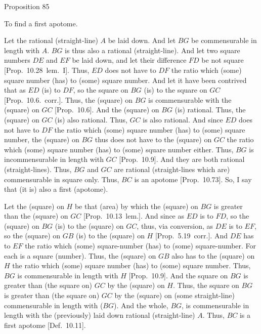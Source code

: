 
\begin{center}
{\large Proposition 85}
\end{center}

To find a first apotome.

\epsfysize=0.65in
\centerline{}

Let the rational (straight-line) $A$ be laid down. And let $BG$
be commensurable in length with $A$. $BG$ is thus also a rational (straight-line).
And let two square numbers
$DE$ and $EF$ be laid down, and let their difference $FD$ be  not 
square [Prop.~10.28~lem.~I]. Thus,
$ED$ does not have to $DF$ the ratio which (some) square number
(has) to (some) square number. And let it have been contrived that
as $ED$ (is) to $DF$, so the square on $BG$ (is) to the square on $GC$
[Prop.~10.6.~corr.]. Thus, the (square) on $BG$
is commensurable with the (square) on $GC$ [Prop.~10.6]. And the (square) on $BG$ (is)
rational. Thus, the (square) on $GC$ (is) also rational. Thus, $GC$ is also
rational. And since $ED$ does not have to $DF$ the ratio which
(some) square number (has) to (some) square number, 
the (square) on $BG$ thus does not have to the (square) on $GC$ the ratio
which (some) square number (has) to (some) square number either. Thus,
$BG$ is incommensurable in length with $GC$ [Prop.~10.9]. And they are both
rational (straight-lines). Thus, $BG$ and $GC$ are rational (straight-lines
which are) commensurable in square only. Thus, $BC$ is an apotome
[Prop.~10.73]. So, I say that (it is)
also a first (apotome).

Let the (square) on $H$ be that (area) by which the (square) on $BG$
is greater than the (square) on $GC$ [Prop.~10.13~lem.]. And since as $ED$ is to
$FD$, so the (square) on $BG$ (is) to the (square) on $GC$, thus, via
conversion, as $DE$ is to $EF$, so the (square) on $GB$ (is) to the
(square) on $H$ [Prop.~5.19~corr.]. 
And $DE$ has to $EF$ the ratio which (some) square-number
(has) to (some) square-number. For each is a square (number). 
Thus, the (square) on $GB$ also has to the (square) on $H$ the ratio which
(some) square number (has) to (some) square number. Thus, $BG$
is commensurable in length with $H$ [Prop.~10.9].
And the square on $BG$ is greater than (the square on) $GC$ by the
(square) on $H$. Thus, the square on $BG$ is greater than (the square on) $GC$ by the
(square) on (some straight-line) commensurable in length with ($BG$).
And the whole, $BG$, is commensurable in length with the (previously)
laid down rational (straight-line) $A$. Thus, $BC$ is a first
apotome [Def.~10.11].

